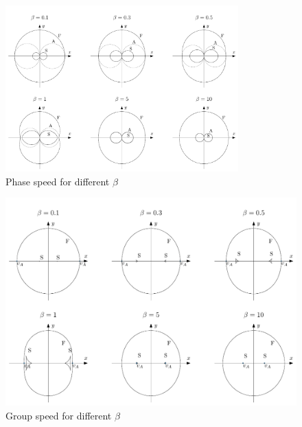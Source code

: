 \documentclass{beamer}
\begin{document}
\begin{frame}
	\begin{figure}[h]
		\centering
		\includegraphics[width=0.8\textwidth]{../report/figures/fasespeed_beta.pdf}
		\caption{Phase speed for different $\beta$}	
	\end{figure}
\end{frame}
\begin{frame}
	\begin{figure}[h]
		\centering
		\includegraphics[width=.9\textwidth]{../report/figures/groupspeed_beta.pdf}
		\caption{Group speed for different $\beta$}
	\end{figure}	
\end{frame}
\end{document}
